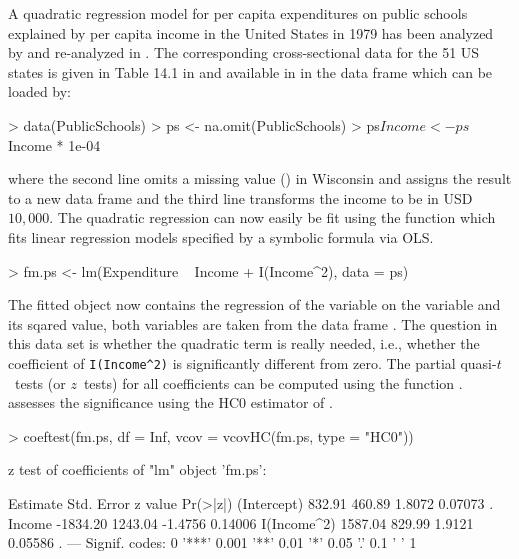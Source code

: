\documentclass{Z}
\begin{document}
A quadratic regression model for per capita expenditures on public schools
explained by per capita income in the United States in 1979
has been analyzed by \cite{hac:Greene:1993} and re-analyzed in
\cite{hac:Cribari-Neto:2004}. The corresponding cross-sectional
data for the 51 US states
is given in Table 14.1 in \cite{hac:Greene:1993} and available in
 in the data frame  which can be
loaded by:
\begin{Schunk}
\begin{Sinput}
> data(PublicSchools)
> ps <- na.omit(PublicSchools)
> ps$Income <- ps$Income * 1e-04
\end{Sinput}
\end{Schunk}
where the second line omits a missing value () in Wisconsin
and assigns the result to a new data frame  and
the third line transforms the income to be in USD $10,000$.
The quadratic regression can now easily be fit using the function
 which fits linear regression models specified by
a symbolic formula via OLS.
\begin{Schunk}
\begin{Sinput}
> fm.ps <- lm(Expenditure ~ Income + I(Income^2), data = ps)
\end{Sinput}
\end{Schunk}
The fitted  object  now contains the regression of
the variable  on the variable 
and its sqared value, both variables are taken from the data frame .
The question in this data set is whether the quadratic term is really 
needed, i.e., whether the coefficient of \verb/I(Income^2)/ is significantly
different from zero. The partial quasi-$t$~tests (or $z$~tests) for all
coefficients can be computed using the function . \cite{hac:Greene:1993}
assesses the significance using the HC0 estimator of \cite{hac:White:1980}.
\begin{Schunk}
\begin{Sinput}
> coeftest(fm.ps, df = Inf, vcov = vcovHC(fm.ps, type = "HC0"))
\end{Sinput}
\begin{Soutput}
z test of coefficients of "lm" object 'fm.ps':

            Estimate Std. Error z value Pr(>|z|)  
(Intercept)   832.91     460.89  1.8072  0.07073 .
Income      -1834.20    1243.04 -1.4756  0.14006  
I(Income^2)  1587.04     829.99  1.9121  0.05586 .
---
Signif. codes:  0 '***' 0.001 '**' 0.01 '*' 0.05 '.' 0.1 ' ' 1 
\end{Soutput}
\end{Schunk}
\end{document}
